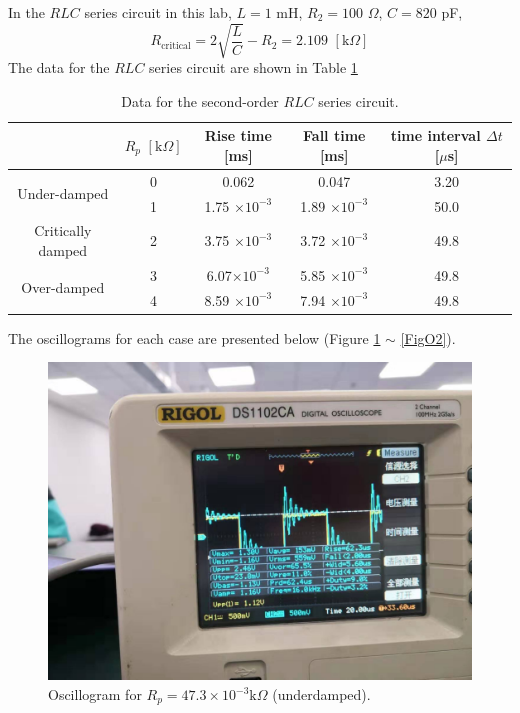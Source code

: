\documentclass{article}
\begin{document}
In the $RLC$ series circuit in this lab, $L = 1$ mH, $R_2 = 100\,\,\Omega$, $C = 820$ pF,
$$R_{{\text{critical}}} = 2\sqrt{\frac{L}{C}} - R_2 = 2.109\,\,[\text{k}\Omega]$$
The data for the $RLC$ series circuit are shown in Table \ref{Table2nd}

\begin{table}[H]
\centering
\begin{tabular}{ccccc}
\toprule
& $R_p\,\,[\text{k}\Omega]$ & Rise time [ms] & Fall time [ms] & time interval $\Delta t$ [$\mu$s]\\
\hline
\multirow{2}{*}{Under-damped} & 0 & 0.062 & 0.047 & 3.20 \\
& 1 & 1.75 $\times 10^{-3}$ & 1.89 $\times 10^{-3}$ & 50.0 \\
\hline
Critically damped  & 2 & 3.75 $\times 10^{-3}$ & 3.72 $\times 10^{-3}$ & 49.8\\
\multirow{2}{*}{Over-damped} & 3 & 6.07$\times 10^{-3}$ & 5.85 $\times 10^{-3}$ & 49.8\\
& 4 & 8.59 $\times 10^{-3}$ & 7.94 $\times 10^{-3}$ & 49.8\\
\hline
\end{tabular}
\caption{Data for the second-order $RLC$ series circuit.}\label{Table2nd}
\end{table}

The oscillograms for each case are presented below (Figure \ref{FigU1} $\sim$ \ref{FigO2}).

\begin{figure}[H]
\centering
\includegraphics[scale=0.25]{1.jpg}
\caption{Oscillogram for $R_p=47.3\times 10^{-3}\text{k}\Omega$ (underdamped).}\label{FigU1}
\end{figure}
\end{document}
